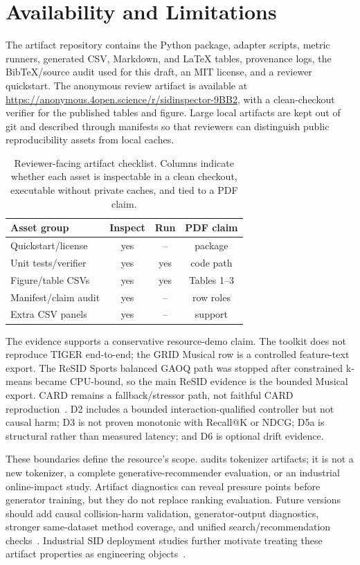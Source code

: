 \section{Availability and Limitations}

The artifact repository contains the \tool Python package, adapter scripts,
metric runners, generated CSV, Markdown, and \LaTeX{} tables, provenance logs,
the BibTeX/source audit used for this draft, an MIT license, and a reviewer
quickstart. The anonymous review artifact is available at
\url{https://anonymous.4open.science/r/sidinspector-9BB2}, with a
clean-checkout verifier for the published tables and figure. Large local
artifacts are kept out of git and described through manifests so that reviewers
can distinguish public reproducibility assets from local caches.

\begin{table}[t]
\caption{Reviewer-facing artifact checklist. Columns indicate whether each
asset is inspectable in a clean checkout, executable without private caches,
and tied to a PDF claim.}
\label{tab:artifact-package}
\small
\setlength{\tabcolsep}{3pt}
\begin{tabular}{@{}lccc@{}}
\toprule
Asset group & Inspect & Run & PDF claim \\
\midrule
Quickstart/license & yes & -- & package \\
Unit tests/verifier & yes & yes & code path \\
Figure/table CSVs & yes & yes & Tables 1--3 \\
Manifest/claim audit & yes & -- & row roles \\
Extra CSV panels & yes & -- & support \\
\bottomrule
\end{tabular}
\end{table}

The evidence supports a conservative resource-demo claim. The toolkit does not
reproduce TIGER end-to-end; the GRID Musical row is a controlled feature-text
export. The ReSID Sports balanced GAOQ path was stopped after constrained
k-means became CPU-bound, so the main ReSID evidence is the bounded Musical
export. CARD remains a fallback/stressor path, not faithful CARD
reproduction~\cite{wei2026card}. D2 includes a bounded interaction-qualified
controller but not causal harm; D3 is not proven monotonic with Recall@K or
NDCG; D5a is structural rather than measured latency; and D6 is optional drift
evidence.

These boundaries define the resource's scope. \tool audits tokenizer
artifacts; it is not a new \sid tokenizer, a complete
generative-recommender evaluation, or an industrial online-impact study.
Artifact diagnostics can reveal pressure points before generator training, but
they do not replace ranking evaluation. Future versions should add causal
collision-harm validation, generator-output diagnostics, stronger same-dataset
method coverage, and unified search/recommendation checks~\cite{penha2025jointsid}.
Industrial SID deployment studies further motivate treating these artifact
properties as engineering objects~\cite{ju2026snapchatsid}.

